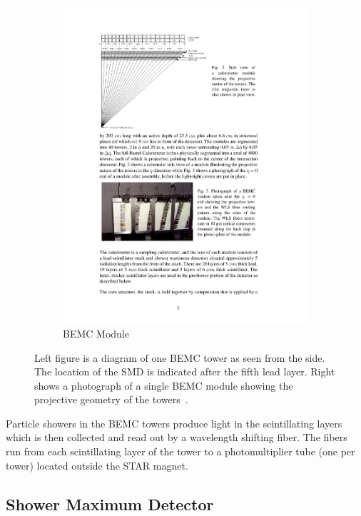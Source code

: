 \begin{figure}[htbp]
\begin{subfigure}{0.5\textwidth}
		\includegraphics[width=\textwidth]{Plots/Detector/BEMC_proj.pdf}
		\caption{BEMC Module}
		\label{fig:BEMC_towerb}
	\end{subfigure}
\caption[BEMC Towers]{Left figure is a diagram of one BEMC tower as seen from the side. The location of the SMD is indicated after the fifth lead layer. Right shows a photograph of a single BEMC module showing the projective geometry of the towers~\cite{emcNIM}.}
\label{fig:BEMC_tower}
\end{figure}

Particle showers in the BEMC towers produce light in the scintillating layers which is then collected and read out by a wavelength shifting fiber. The fibers run from each scintillating layer of the tower to a photomultiplier tube (one per tower) located outside the STAR magnet.

\subsection{Shower Maximum Detector}

